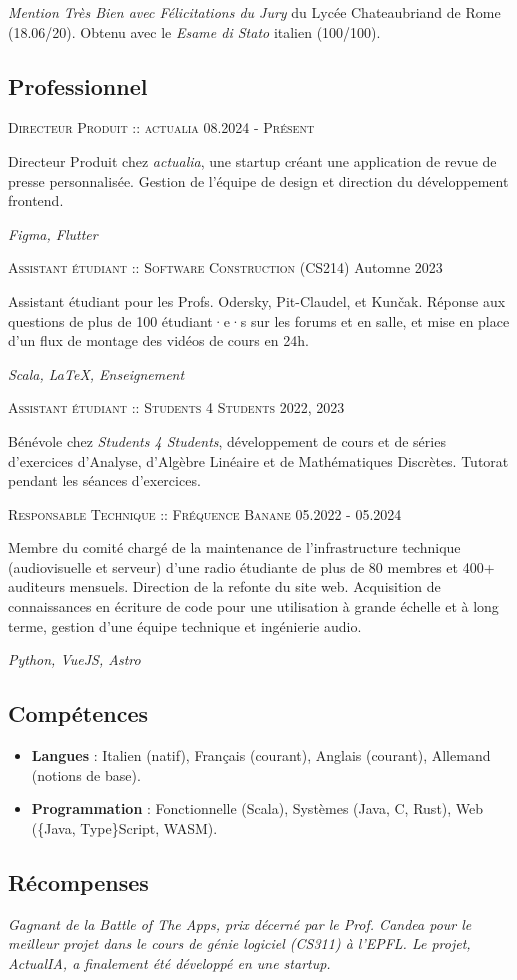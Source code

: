 \documentclass[10pt]{article}
\renewcommand{\line}[2]{{\vspace{4pt} \large \noindent\textsc{#1} \hfill \small{#2}}\vspace{4pt}}
\begin{document}
  \textit{Mention Très Bien avec Félicitations du Jury} du Lycée Chateaubriand de Rome (18.06/20). Obtenu avec le \textit{Esame di Stato} italien (100/100).

  \subsection*{Professionnel}

  \line{Directeur Produit :: actualia}{08.2024 - \textsc{Présent}}

  Directeur Produit chez \textit{actualia}, une startup créant une application de revue de presse personnalisée. Gestion de l'équipe de design et direction du développement frontend.

  \textit{Figma, Flutter}

  \line{Assistant étudiant :: Software Construction (CS214)}{Automne 2023}

  Assistant étudiant pour les Profs. Odersky, Pit-Claudel, et Kunčak. Réponse aux questions de plus de 100 étudiant·e·s sur les forums et en salle, et mise en place d'un flux de montage des vidéos de cours en 24h.

  \textit{Scala, LaTeX, Enseignement}

  \line{Assistant étudiant :: Students 4 Students}{2022, 2023}

  Bénévole chez \textit{Students 4 Students}, développement de cours et de séries d'exercices d'Analyse, d'Algèbre Linéaire et de Mathématiques Discrètes. Tutorat pendant les séances d'exercices.

  \line{Responsable Technique :: Fréquence Banane}{05.2022 - 05.2024}

  Membre du comité chargé de la maintenance de l'infrastructure technique (audiovisuelle et serveur) d'une radio étudiante de plus de 80 membres et 400+ auditeurs mensuels. Direction de la refonte du site web. Acquisition de connaissances en écriture de code pour une utilisation à grande échelle et à long terme, gestion d'une équipe technique et ingénierie audio.

  \textit{Python, VueJS, Astro}

  \subsection*{Compétences}

  \begin{adjustwidth}{}{}
    \begin{itemize}
      \item[] \textbf{Langues} : Italien (natif), Français (courant), Anglais (courant), Allemand (notions de base).
      \item[] \textbf{Programmation} : Fonctionnelle (Scala), Systèmes (Java, C, Rust), Web (\{Java, Type\}Script, WASM).
    \end{itemize}
  \end{adjustwidth}

  \subsection*{Récompenses}

  \textit{Gagnant de la Battle of The Apps, prix décerné par le Prof. Candea pour le meilleur projet dans le cours de génie logiciel (CS311) à l'EPFL. Le projet, ActualIA, a finalement été développé en une startup.}
\end{document}
